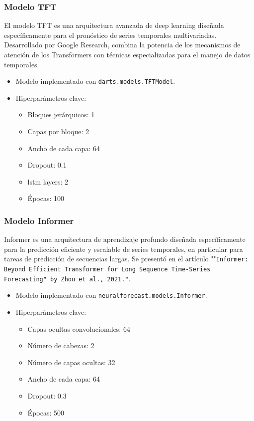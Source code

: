 \documentclass[12pt]{article}
\begin{document}
\subsubsection{Modelo TFT}

El modelo TFT es una arquitectura avanzada de deep learning diseñada específicamente para el pronóstico de series temporales multivariadas.
Desarrollado por Google Research, combina la potencia de los mecanismos de atención de los Transformers con técnicas especializadas para el manejo de datos temporales.

\begin{itemize}
\item Modelo implementado con \texttt{darts.models.TFTModel}.
\item Hiperparámetros clave:
\begin{itemize}
\item Bloques jerárquicos: 1 %
\item Capas por bloque: 2
\item Ancho de cada capa: 64
\item Dropout: 0.1
\item lstm layers: 2
\item Épocas: 100
\end{itemize}
\end{itemize}


\subsubsection{Modelo Informer}

Informer es una arquitectura de aprendizaje profundo diseñada específicamente para la predicción eficiente y escalable de series temporales, en particular para tareas de predicción de secuencias largas.
Se presentó en el artículo ""\texttt{Informer: Beyond Efficient Transformer for Long Sequence Time-Series Forecasting" by Zhou et al., 2021."}.

\begin{itemize}
\item Modelo implementado con \texttt{neuralforecast.models.Informer}.
\item Hiperparámetros clave:
\begin{itemize}
\item Capas ocultas convolucionales: 64
\item Número de cabezas: 2
\item Número de capas ocultas: 32
\item Ancho de cada capa: 64
\item Dropout: 0.3
\item Épocas: 500
\end{itemize}
\end{itemize}
\end{document}
